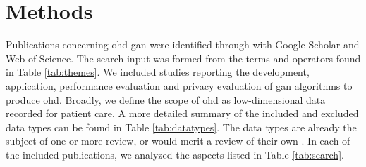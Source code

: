 \section{Methods}

    
    
    Publications concerning \gls{ohd-gan} were identified through with Google Scholar and Web of Science. The search input was formed from the terms and operators found in Table \ref{tab:themes}. We included studies reporting the development, application, performance evaluation and privacy evaluation of \gls{gan} algorithms to produce \gls{ohd}. Broadly, we define the scope of \gls{ohd} as low-dimensional data recorded for patient care. A more detailed summary of the included and excluded data types can be found in Table \ref{tab:datatypes}. The data types are already the subject of one or more review, or would merit a review of their own \cite{Yi_2019, Nakata2019, Anwar_2018}. In each of the included publications, we analyzed the aspects listed in Table \ref{tab:search}.\par
    
    
    
    







